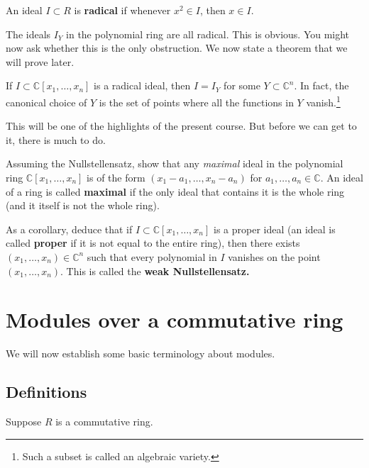 \begin{definition}\label{def-radical-ideal} 
An ideal $I \subset R$ is \textbf{radical} if whenever $x^2 \in I$, then $x \in
I$.
\end{definition} 

The ideals $I_Y$ in the polynomial ring are all radical.  This is obvious.
You might now ask whether this is the only obstruction. We now state a theorem
that we will prove later.

\begin{theorem} If $I \subset \mathbb{C}[x_1, \dots,
x_n]$ is a radical ideal, then $I = I_Y$ for some $Y \subset \mathbb{C}^n$. In
fact, the canonical choice of $Y$ is the set of points where all the functions
in $Y$ vanish.\footnote{Such a subset is called an algebraic variety.}
\end{theorem} 


This will be one of the highlights of the present course. But before we can
get to it, there is much to do.

\begin{exercise} 
Assuming the Nullstellensatz, show that any \emph{maximal} ideal in the
polynomial ring $\mathbb{C}[x_1, \dots, x_n]$ is of the form 
$(x_1-a_1, \dots, x_n-a_n)$ for $a_1, \dots, a_n \in \mathbb{C}$. An ideal of a
ring is called \textbf{maximal} if the only ideal that contains it is the
whole ring (and it itself is not the whole ring).

As a corollary, deduce that if $I \subset \mathbb{C}[x_1, \dots, x_n]$ is a
proper ideal (an ideal is called \textbf{proper} if it is not equal to the
entire ring), then there exists $(x_1, \dots, x_n) \in \mathbb{C}^n$ such that
every polynomial in $I$ vanishes on the point $(x_1, \dots, x_n)$. This is
called the \textbf{weak Nullstellensatz.}
\end{exercise} 

\section{Modules over a commutative ring}



We will now establish some basic terminology about modules.

\subsection{Definitions}
Suppose $R$ is a commutative ring.  

